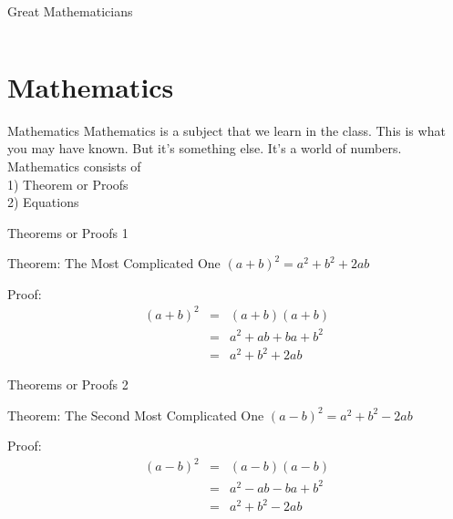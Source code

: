 \documentclass{beamer}
\begin{document}
\begin{frame}{Great Mathematicians}
\begin{columns}
\begin{column}{0.8\textwidth}
\end{column}
\end{columns}   
\end{frame}

\section{Mathematics}
\begin{frame}{Mathematics}
    Mathematics is a subject that we learn in the class. This is what you may have known. But it’s something else. It’s a world of numbers.\\
    \pause
    Mathematics consists of \\
    1) Theorem or Proofs \pause\\
    2) Equations\\
    
\end{frame}

\begin{frame}{Theorems or Proofs 1}
    \begin{block}{Theorem: The Most Complicated One}
        $(a+b)^2=a^2 + b^2 + 2ab$
    \end{block}
    \begin{exampleblock}{Proof:}
    \begin{eqnarray}
            (a+b)^2 & = & (a+b)(a+b) \nonumber \\
                    & = & a^2 + ab + ba + b^2\nonumber \\
                    & = & a^2 + b^2 +2ab\nonumber
    \end{eqnarray}
    \end{exampleblock}
\end{frame}

\begin{frame}{Theorems or Proofs 2}
    \begin{block}{Theorem: The Second Most Complicated One}
        $(a-b)^2=a^2 + b^2 - 2ab$
    \end{block}
    \begin{exampleblock}{Proof:}
        \begin{eqnarray}
            (a-b)^2 & = & (a-b)(a-b) \nonumber \\
                    & = & a^2 - ab - ba + b^2\nonumber \\
                    & = & a^2 + b^2 -2ab\nonumber
    \end{eqnarray}
    \end{exampleblock}
\end{frame}
\end{document}
